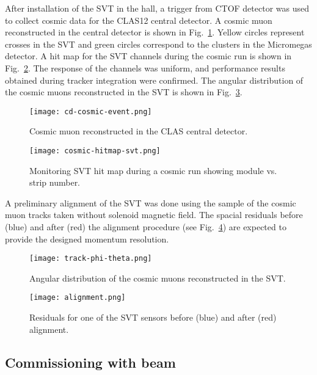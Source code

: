 After installation of the SVT in the hall, a trigger from CTOF detector was used to collect cosmic data for the CLAS12 central detector. A cosmic muon reconstructed in the central detector is shown in Fig.~\ref{fig:cd-cosmic-event}. Yellow circles represent crosses in the SVT and green circles correspond to the clusters in the Micromegas detector. A hit map for the SVT channels during the cosmic run is shown in Fig.~\ref{fig:cosmic-hitmap-svt}. The response of the channels was uniform, and performance results obtained during tracker integration were confirmed.
The angular distribution of the cosmic muons reconstructed in the SVT is shown in Fig.~\ref{fig:track-phi-theta}.

\begin{figure}[hbt] 
\centering 
\texttt{[image: cd-cosmic-event.png]}
\caption{Cosmic muon reconstructed in the CLAS central detector.}
\label{fig:cd-cosmic-event}
\end{figure}

\begin{figure}[hbt] 
\centering 
\texttt{[image: cosmic-hitmap-svt.png]}
\caption{Monitoring SVT hit map during a cosmic run showing module vs. strip number.}
\label{fig:cosmic-hitmap-svt}
\end{figure}

A preliminary alignment of the SVT was done using the sample of the cosmic muon tracks taken without solenoid magnetic field. The spacial residuals before (blue) and after (red) the alignment procedure (see Fig.~\ref{fig:alignment}) are expected to provide the designed momentum resolution.

\begin{figure}[hbt] 
\centering 
\texttt{[image: track-phi-theta.png]}
\caption{Angular distribution of the cosmic muons reconstructed in the SVT.}
\label{fig:track-phi-theta}
\end{figure}

\begin{figure}[hbt] 
\centering 
\texttt{[image: alignment.png]}
\caption{Residuals for one of the SVT sensors before (blue) and after (red) alignment.}
\label{fig:alignment}
\end{figure}

\subsection{Commissioning with beam}

